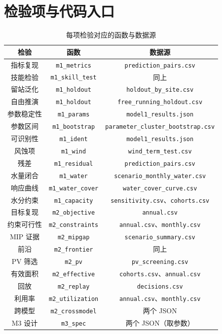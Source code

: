 \documentclass[11pt,a4paper]{ctexart}
\begin{document}
\appendix
\section{检验项与代码入口}

\begin{longtable}{|c|c|c|}
\caption{每项检验对应的函数与数据源}\\
\hline
检验 & 函数 & 数据源 \\
\hline
\endhead
指标复现 & \texttt{m1\_metrics} & \texttt{prediction\_pairs.csv} \\
技能检验 & \texttt{m1\_skill\_test} & 同上 \\
留站泛化 & \texttt{m1\_holdout} & \texttt{holdout\_by\_site.csv} \\
自由推演 & \texttt{m1\_holdout} & \texttt{free\_running\_holdout.csv} \\
参数稳定性 & \texttt{m1\_params} & \texttt{model1\_results.json} \\
参数区间 & \texttt{m1\_bootstrap} & \texttt{parameter\_cluster\_bootstrap.csv} \\
可识别性 & \texttt{m1\_ident} & \texttt{model1\_results.json} \\
风蚀项 & \texttt{m1\_wind} & \texttt{wind\_term\_test.csv} \\
残差 & \texttt{m1\_residual} & \texttt{prediction\_pairs.csv} \\
水量闭合 & \texttt{m1\_water} & \texttt{scenario\_monthly\_water.csv} \\
响应曲线 & \texttt{m1\_water\_cover} & \texttt{water\_cover\_curve.csv} \\
水分约束 & \texttt{m1\_capacity} & \texttt{sensitivity.csv}、\texttt{cohorts.csv} \\
目标复现 & \texttt{m2\_objective} & \texttt{annual.csv} \\
约束可行性 & \texttt{m2\_constraints} & \texttt{annual.csv}、\texttt{monthly.csv} \\
MIP 证据 & \texttt{m2\_mipgap} & \texttt{scenario\_summary.csv} \\
前沿 & \texttt{m2\_frontier} & 同上 \\
PV 筛选 & \texttt{m2\_pv} & \texttt{pv\_screening.csv} \\
有效面积 & \texttt{m2\_effective} & \texttt{cohorts.csv}、\texttt{annual.csv} \\
回放 & \texttt{m2\_replay} & \texttt{decisions.csv} \\
利用率 & \texttt{m2\_utilization} & \texttt{annual.csv}、\texttt{monthly.csv} \\
跨模型 & \texttt{m2\_crossmodel} & 两个 JSON \\
M3 设计 & \texttt{m3\_spec} & 两个 JSON（取参数） \\
\hline
\end{longtable}
\end{document}
